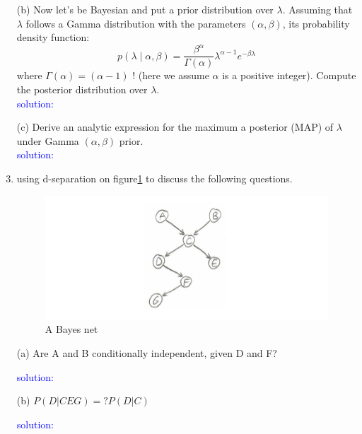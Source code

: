 \documentclass[10pt]{article}
\begin{document}
\begin{enumerate}[1.]
\item[(b)]Now let's be Bayesian and put a prior distribution over $\lambda$. Assuming that $\lambda$ follows a Gamma distribution with the parameters $(\alpha, \beta)$, its probability density function:
$$
p(\lambda \mid \alpha, \beta)=\frac{\beta^\alpha}{\Gamma(\alpha)} \lambda^{\alpha-1} e^{-\beta \lambda}
$$
where $\Gamma(\alpha)=(\alpha-1)$ ! (here we assume $\alpha$ is a positive integer). Compute the posterior distribution over $\lambda$. 
\\
\textcolor{blue}{solution:}
\item[(c)] Derive an analytic expression for the maximum a posterior (MAP) of $\lambda$ under Gamma $(\alpha, \beta)$ prior.
\\
\textcolor{blue}{solution:}




\newpage
\item {} using d-separation on figure\ref{bayesnet} to discuss the following questions.
\begin{figure}[htbp]
    \centering
    \includegraphics[scale=0.5]{figs/p3_1.jpg}
    \caption{A Bayes net}
    \label{bayesnet}
    \end{figure} 

\item[(a)] Are A and B conditionally independent, given D and F? 

    \textcolor{blue}{solution:}

\item[(b)] $P(D|CEG) =? P(D|C)$

\textcolor{blue}{solution:}
\end{enumerate}
\end{document}

